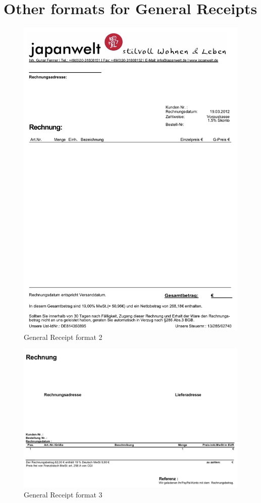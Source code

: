 \section{Other formats for General Receipts}
\begin{figure}[H]
\centering
\includegraphics[scale=0.6]{images/GR-Formats/gs-format-2.png}
\caption{General Receipt format 2}
\label{ls_format2}
\end{figure}
\begin{figure}[H]
\centering
\includegraphics[scale=0.6]{images/GR-Formats/gs-format-3.png}
\caption{General Receipt format 3}
\label{ls_format2}
\end{figure}
